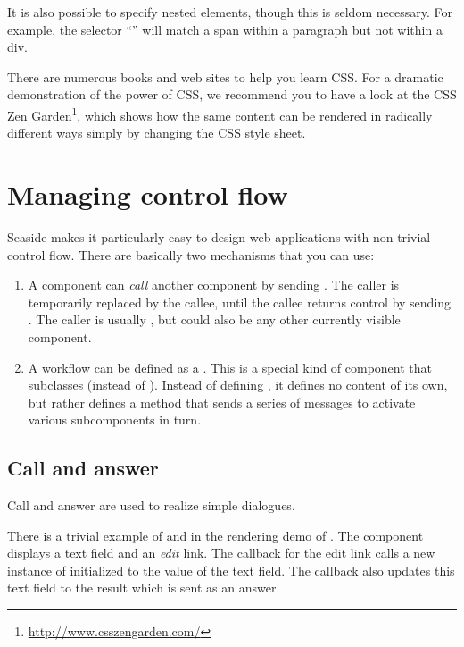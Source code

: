 \documentclass[a4paper,10pt,twoside]{book}
\begin{document}
It is also possible to specify nested elements, though this is seldom necessary.
For example, the selector ``'' will match a span within a paragraph but not within a div.

There are numerous books and web sites to help you learn CSS.
For a dramatic demonstration of the power of CSS, we recommend you to have a look at the CSS Zen Garden\footnote{\url{http://www.csszengarden.com/}}, which shows how the same content can be rendered in radically different ways simply by changing the CSS style sheet.

\section{Managing control flow}

Seaside makes it particularly easy to design web applications with non-trivial control flow.
There are basically two mechanisms that you can use:

\begin{enumerate}
  \item A component can \emph{call} another component by sending .
  The caller is temporarily replaced by the callee, until the callee returns control by sending .
  The caller is usually , but could also be any other currently visible component.

  \item A workflow can be defined as a .
  This is a special kind of component that subclasses  (instead of ). 
  Instead of defining , it defines no content of its own, but rather defines a  method that sends a series of  messages to activate various subcomponents in turn.
\end{enumerate}

\subsection{Call and answer}

Call and answer are used to realize simple dialogues.

There is a trivial example of  and  in the rendering demo of .
The component  displays a text field and an \emph{edit} link.
The callback for the edit link calls a new instance of  initialized to the value of the text field.
The callback also updates this text field to the result which is sent as an answer.
\end{document}
